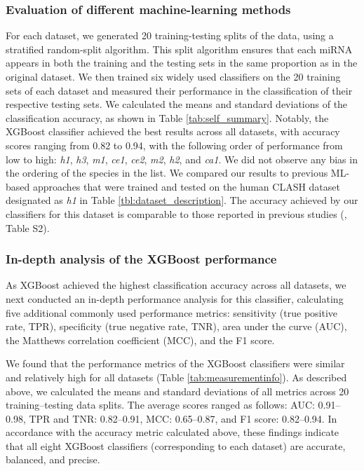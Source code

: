 \documentclass{bmcart}
\begin{document}
\subsubsection*{Evaluation of different machine-learning methods} \label{sec:evaluation_different_ML}
For each dataset, we generated 20 training-testing splits of the data, using a stratified random-split algorithm. This split algorithm ensures that each miRNA appears in both the training and the testing sets in the same proportion as in the original dataset.
We then trained six widely used classifiers on the 20 training sets of each dataset and measured their performance in the classification of their respective testing sets. We calculated the means and standard deviations of the classification accuracy, as shown in Table \ref{tab:self_summary}. Notably, the XGBoost classifier achieved the best results across all datasets, with accuracy scores ranging from 0.82 to 0.94, with the following order of performance from low to high: \textit{h1},  \textit{h3},  \textit{m1}, \textit{ce1}, \textit{ce2}, \textit{m2}, \textit{h2}, and \textit{ca1}. We did not observe any bias in the ordering of the species in the list.   
We compared our results to previous ML-based approaches that were trained and tested on the human CLASH dataset designated as \textit{h1} in Table \ref{tbl:dataset_description}. The accuracy achieved by our classifiers for this dataset is comparable to those reported in previous studies (, Table S2). 



\subsubsection*{In-depth analysis of the XGBoost performance}
As XGBoost achieved the highest classification accuracy across all datasets, we next conducted an in-depth performance analysis for this classifier, calculating five additional commonly used performance metrics:
sensitivity (true positive rate, TPR), specificity (true negative rate, TNR), area under the curve (AUC), the Matthews correlation coefficient (MCC), and the F1 score. 

We found that the performance metrics of the XGBoost classifiers were similar and relatively high for all datasets (Table \ref{tab:measurementinfo}). As described above, we calculated the means and standard deviations of all metrics across 20 training--testing data splits. The average scores ranged as follows: AUC: 0.91--0.98, TPR and TNR: 0.82--0.91, MCC: 0.65--0.87, and F1 score: 0.82--0.94. In accordance with the accuracy metric calculated above, these findings indicate that all eight XGBoost classifiers (corresponding to each dataset) are accurate, balanced, and precise. 
\end{document}
